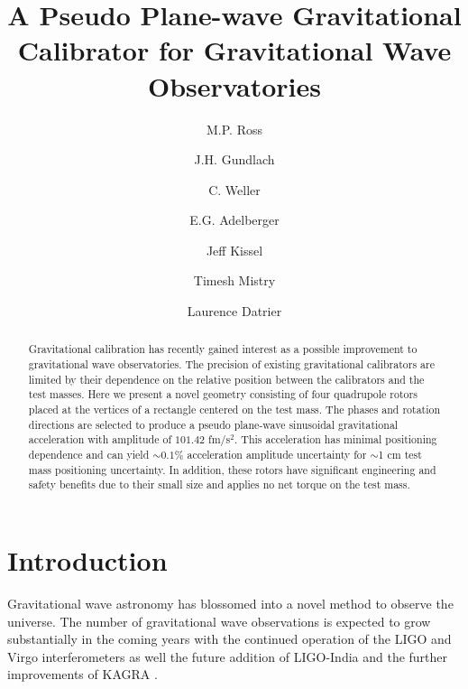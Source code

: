 \documentclass[superscriptaddress, twocolumn, prd]{revtex4-1}
\begin{document}
\title{A Pseudo Plane-wave Gravitational Calibrator for Gravitational Wave Observatories}

\author{M.P. Ross}
\author{J.H. Gundlach}
\author{C. Weller}
\author{E.G. Adelberger}
\author{Jeff Kissel}
\author{Timesh Mistry}
\author{Laurence Datrier}


\begin{abstract}

Gravitational calibration has recently gained interest as a possible improvement to gravitational wave observatories. The precision of existing gravitational calibrators are limited by their dependence on the relative position between the calibrators and the test masses. Here we present a novel geometry consisting of four quadrupole rotors placed at the vertices of a rectangle centered on the test mass. The phases and rotation directions are selected to produce a pseudo plane-wave  sinusoidal gravitational acceleration with amplitude of $101.42$ fm/s$^2$. This acceleration has minimal positioning dependence and can yield $\sim0.1 \%$ acceleration amplitude uncertainty for $\sim$1 cm test mass positioning uncertainty. In addition, these rotors have significant engineering and safety benefits due to their small size and applies no net torque on the test mass.

\end{abstract}

\maketitle

\section{Introduction}

Gravitational wave astronomy has blossomed into a novel method to observe the universe. The number of gravitational wave observations is expected to grow substantially in the coming years with the continued operation of the LIGO \cite{aLIGO} and Virgo \cite{virgo} interferometers as well the future addition of LIGO-India \cite{ligo-india} and the further improvements of KAGRA \cite{kagra}. 
\end{document}
